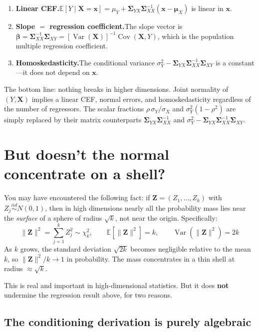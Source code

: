 \documentclass[11pt]{article}
\newcommand{\Var}{\operatorname{Var}}
\newcommand{\Cov}{\operatorname{Cov}}
\begin{document}
\begin{enumerate}[leftmargin=2em]
\item \textbf{Linear CEF.}\quad $\mathbb{E}[Y\mid\bm{X}=\bm{x}] = \mu_Y + \bm{\Sigma}_{YX}\bm{\Sigma}_{XX}^{-1}(\bm{x}-\bm{\mu}_X)$ is linear in $\bm{x}$.

\item \textbf{Slope $=$ regression coefficient.}\quad The slope vector is $\bm{\beta} = \bm{\Sigma}_{XX}^{-1}\bm{\Sigma}_{XY} = [\Var(\bm{X})]^{-1}\Cov(\bm{X},Y)$, which is the population multiple regression coefficient.

\item \textbf{Homoskedasticity.}\quad The conditional variance $\sigma_Y^2 - \bm{\Sigma}_{YX}\bm{\Sigma}_{XX}^{-1}\bm{\Sigma}_{XY}$ is a constant---it does not depend on $\bm{x}$.
\end{enumerate}

\medskip\noindent
The bottom line: nothing breaks in higher dimensions.  Joint normality of $(Y, \bm{X})$ implies a linear CEF, normal errors, and homoskedasticity regardless of the number of regressors.  The scalar fractions $\rho\,\sigma_Y/\sigma_X$ and $\sigma_Y^2(1-\rho^2)$ are simply replaced by their matrix counterparts $\bm{\Sigma}_{YX}\bm{\Sigma}_{XX}^{-1}$ and $\sigma_Y^2 - \bm{\Sigma}_{YX}\bm{\Sigma}_{XX}^{-1}\bm{\Sigma}_{XY}$.

\section{But doesn't the normal concentrate on a shell?}

You may have encountered the following fact: if $\bm{Z} = (Z_1, \ldots, Z_k)$ with $Z_j\overset{iid}{\sim}N(0,1)$, then in high dimensions nearly all the probability mass lies near the \emph{surface} of a sphere of radius $\sqrt{k}$, not near the origin.  Specifically:
\[
\|\bm{Z}\|^2 = \sum_{j=1}^k Z_j^2 \sim \chi^2_k, \qquad
\mathbb{E}[\|\bm{Z}\|^2] = k, \qquad
\Var(\|\bm{Z}\|^2) = 2k
\]
As $k$ grows, the standard deviation $\sqrt{2k}$ becomes negligible relative to the mean $k$, so $\|\bm{Z}\|^2/k \to 1$ in probability.  The mass concentrates in a thin shell at radius $\approx\!\sqrt{k}$.

\medskip\noindent
This is real and important in high-dimensional statistics.  But it does \textbf{not} undermine the regression result above, for two reasons.

\subsection{The conditioning derivation is purely algebraic}
\end{document}
